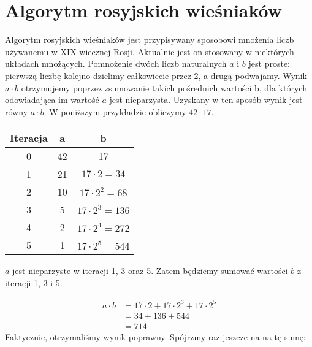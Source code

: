 \section{Algorytm rosyjskich wieśniaków}



Algorytm rosyjskich wieśniaków jest przypisywany sposobowi mnożenia liczb używanemu w XIX-wiecznej Rosji.
Aktualnie jest on stosowany w niektórych układach mnożących.
Pomnożenie dwóch liczb naturalnych $a$ i $b$ jest proste: pierwszą liczbę kolejno dzielimy całkowiecie przez 2, a drugą podwajamy.
Wynik $a \cdot b$ otrzymujemy poprzez zsumowanie takich pośrednich wartości b, dla których odowiadająca im wartość $a$ jest nieparzysta.
Uzyskany w ten sposób wynik jest równy $a \cdot b$.
W poniższym przykładzie obliczymy $42 \cdot 17$.

\begin{center}
\begin{tabular}{ |c|c|c| } 
 \hline
 Iteracja & a & b \\ 
 \hline
 0 & 42 & 17 \\ 
 1 & 21 & $17 \cdot 2 = 34$ \\
 2 & 10 & $17 \cdot 2^2 = 68$ \\
 3 & 5  & $17 \cdot 2^3 = 136$ \\
 4 & 2  & $17 \cdot 2^4 = 272$ \\
 5 & 1  & $17 \cdot 2^5 = 544$ \\
 
 \hline
\end{tabular}
\end{center}

$a$ jest nieparzyste w iteracji 1, 3 oraz 5. Zatem będziemy sumować wartości $b$ z iteracji 1, 3 i 5.

\begin{equation*} 
\begin{split}
a \cdot b &= 17\cdot2 + 17\cdot2^3 + 17\cdot2^5 \\
&= 34 + 136 + 544 \\
&= 714
\end{split}
\end{equation*}
Faktycznie, otrzymaliśmy wynik poprawny. Spójrzmy raz jeszcze na na tę sumę:

